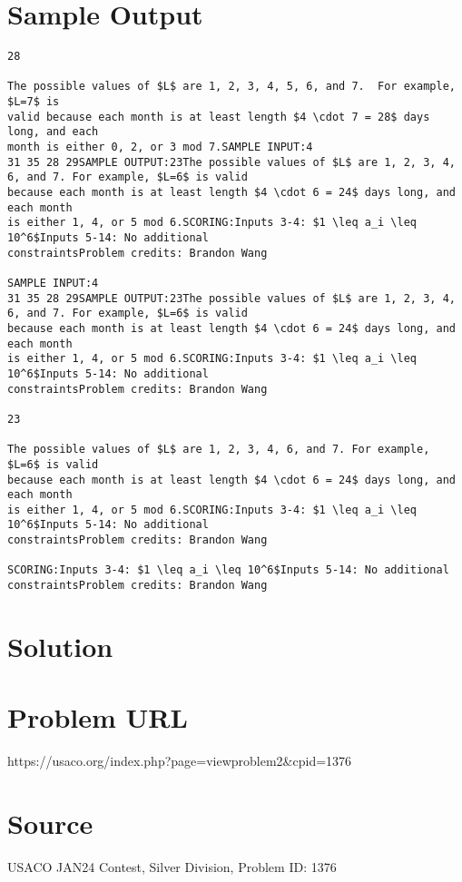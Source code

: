 \documentclass[12pt]{article}
\begin{document}
\section*{Sample Output}
\begin{verbatim}
28

The possible values of $L$ are 1, 2, 3, 4, 5, 6, and 7.  For example, $L=7$ is
valid because each month is at least length $4 \cdot 7 = 28$ days long, and each
month is either 0, 2, or 3 mod 7.SAMPLE INPUT:4
31 35 28 29SAMPLE OUTPUT:23The possible values of $L$ are 1, 2, 3, 4, 6, and 7. For example, $L=6$ is valid
because each month is at least length $4 \cdot 6 = 24$ days long, and each month
is either 1, 4, or 5 mod 6.SCORING:Inputs 3-4: $1 \leq a_i \leq 10^6$Inputs 5-14: No additional
constraintsProblem credits: Brandon Wang

SAMPLE INPUT:4
31 35 28 29SAMPLE OUTPUT:23The possible values of $L$ are 1, 2, 3, 4, 6, and 7. For example, $L=6$ is valid
because each month is at least length $4 \cdot 6 = 24$ days long, and each month
is either 1, 4, or 5 mod 6.SCORING:Inputs 3-4: $1 \leq a_i \leq 10^6$Inputs 5-14: No additional
constraintsProblem credits: Brandon Wang

23

The possible values of $L$ are 1, 2, 3, 4, 6, and 7. For example, $L=6$ is valid
because each month is at least length $4 \cdot 6 = 24$ days long, and each month
is either 1, 4, or 5 mod 6.SCORING:Inputs 3-4: $1 \leq a_i \leq 10^6$Inputs 5-14: No additional
constraintsProblem credits: Brandon Wang

SCORING:Inputs 3-4: $1 \leq a_i \leq 10^6$Inputs 5-14: No additional
constraintsProblem credits: Brandon Wang
\end{verbatim}

\section*{Solution}


\section*{Problem URL}
https://usaco.org/index.php?page=viewproblem2&cpid=1376

\section*{Source}
USACO JAN24 Contest, Silver Division, Problem ID: 1376
\end{document}
